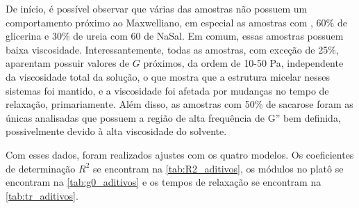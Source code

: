 	De início, é possível observar que várias das amostras não possuem um comportamento próximo ao Maxwelliano, em especial as amostras com \BD{}, 60\% de glicerina e 30\% de ureia com 60 \mM{} de NaSal. Em comum, essas amostras possuem baixa viscosidade. Interessantemente, todas as amostras, com exceção de  \BD{} 25\%, aparentam possuir valores de \(G\) próximos, da ordem de 10-50 Pa, independente da viscosidade total da solução, o que mostra que a estrutura micelar nesses sistemas foi mantido, e a viscosidade foi afetada por mudanças no tempo de relaxação, primariamente. Além disso, as amostras com 50\% de sacarose foram as únicas analisadas que possuem a região de alta frequência de G'' bem definida, possivelmente devido à alta viscosidade do solvente.
	
	Com esses dados, foram realizados ajustes com os quatro modelos. Os coeficientes de determinação \(R^2\) se encontram na \autoref{tab:R2_aditivos}, os módulos no platô se encontram na \autoref{tab:g0_aditivos} e os tempos de relaxação se encontram na \autoref{tab:tr_aditivos}. 


